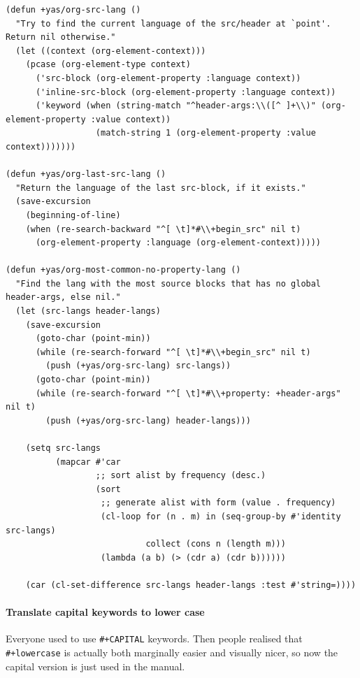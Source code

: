 \documentclass[11pt]{article}
\begin{document}
\begin{verbatim}
(defun +yas/org-src-lang ()
  "Try to find the current language of the src/header at `point'.
Return nil otherwise."
  (let ((context (org-element-context)))
    (pcase (org-element-type context)
      ('src-block (org-element-property :language context))
      ('inline-src-block (org-element-property :language context))
      ('keyword (when (string-match "^header-args:\\([^ ]+\\)" (org-element-property :value context))
                  (match-string 1 (org-element-property :value context)))))))

(defun +yas/org-last-src-lang ()
  "Return the language of the last src-block, if it exists."
  (save-excursion
    (beginning-of-line)
    (when (re-search-backward "^[ \t]*#\\+begin_src" nil t)
      (org-element-property :language (org-element-context)))))

(defun +yas/org-most-common-no-property-lang ()
  "Find the lang with the most source blocks that has no global header-args, else nil."
  (let (src-langs header-langs)
    (save-excursion
      (goto-char (point-min))
      (while (re-search-forward "^[ \t]*#\\+begin_src" nil t)
        (push (+yas/org-src-lang) src-langs))
      (goto-char (point-min))
      (while (re-search-forward "^[ \t]*#\\+property: +header-args" nil t)
        (push (+yas/org-src-lang) header-langs)))

    (setq src-langs
          (mapcar #'car
                  ;; sort alist by frequency (desc.)
                  (sort
                   ;; generate alist with form (value . frequency)
                   (cl-loop for (n . m) in (seq-group-by #'identity src-langs)
                            collect (cons n (length m)))
                   (lambda (a b) (> (cdr a) (cdr b))))))

    (car (cl-set-difference src-langs header-langs :test #'string=))))
\end{verbatim}

\paragraph{Translate capital keywords to lower case}
\label{sec:org1128ecb}
Everyone used to use \texttt{\#+CAPITAL} keywords. Then people realised that \texttt{\#+lowercase}
is actually both marginally easier and visually nicer, so now the capital
version is just used in the manual.
\end{document}
